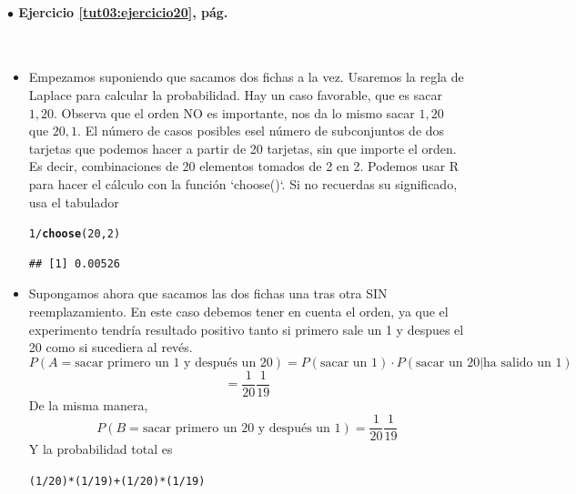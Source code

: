 \documentclass[10pt,a4paper]{article}\usepackage[]{graphicx}\usepackage[]{color}
\makeatletter
\newcommand{\hlnum}[1]{\textcolor[rgb]{0.686,0.059,0.569}{#1}}%
\newcommand{\hlopt}[1]{\textcolor[rgb]{0,0,0}{#1}}%
\newcommand{\hlstd}[1]{\textcolor[rgb]{0.345,0.345,0.345}{#1}}%
\newcommand{\hlkwd}[1]{\textcolor[rgb]{0.737,0.353,0.396}{\textbf{#1}}}%
\newenvironment{kframe}{%
 \def\at@end@of@kframe{}%
 \ifinner\ifhmode%
  \def\at@end@of@kframe{\end{minipage}}%
  \begin{minipage}{\columnwidth}%
 \fi\fi%
 \def\FrameCommand##1{\hskip\@totalleftmargin \hskip-\fboxsep
 \colorbox{shadecolor}{##1}\hskip-\fboxsep
     \hskip-\linewidth \hskip-\@totalleftmargin \hskip\columnwidth}%
 \MakeFramed {\advance\hsize-\width
   \@totalleftmargin\z@ \linewidth\hsize
   \@setminipage}}%
 {\par\unskip\endMakeFramed%
 \at@end@of@kframe}
\newenvironment{knitrout}{}{} %
\makeatother
\begin{document}
\paragraph{\bf $\bullet$ Ejercicio \ref{tut03:ejercicio20}, pág. \pageref{tut03:ejercicio20}}
\label{tut03:ejercicio20:sol}\quad\\ 
\begin{itemize}
\item Empezamos suponiendo que sacamos dos fichas a la vez. Usaremos la regla de Laplace para calcular la probabilidad. Hay un caso favorable, que es sacar ${1,20}$. Observa que el orden NO es importante, nos da lo mismo sacar ${1,20}$ que ${20, 1}$. El n\'umero de casos posibles esel n\'umero de subconjuntos de dos tarjetas que podemos hacer a partir de 20 tarjetas, sin que importe el orden. Es decir, combinaciones de 20 elementos tomados de 2 en 2. Podemos usar R para hacer el cálculo con la función `choose()`. Si no recuerdas su significado, usa el tabulador
\begin{knitrout}
\color{fgcolor}\begin{kframe}
\begin{alltt}
\hlnum{1}\hlopt{/}\hlkwd{choose}\hlstd{(}\hlnum{20}\hlstd{,}\hlnum{2}\hlstd{)}
\end{alltt}
\begin{verbatim}
## [1] 0.00526
\end{verbatim}
\end{kframe}
\end{knitrout}
\item Supongamos ahora que sacamos las dos fichas una tras otra SIN reemplazamiento. En este caso debemos tener en cuenta el orden, ya que el experimento tendría resultado positivo tanto si primero sale un 1 y despues el 20 como si sucediera al revés.  
$$P(A=\text{sacar primero un 1 y después un 20}) = P(\text{sacar un 1})· 
P(\text{sacar un 20}|\text{ha salido un 1})$$
$$=\frac{1}{20}\frac{1}{19} $$
De la misma manera, 
$$P(B=\text{sacar primero un 20 y después un 1}) =\frac{1}{20}\frac{1}{19} $$
Y la probabilidad total es 
\begin{knitrout}
\color{fgcolor}\begin{kframe}
\begin{alltt}
\hlstd{(}\hlnum{1}\hlopt{/}\hlnum{20}\hlstd{)}\hlopt{*}\hlstd{(}\hlnum{1}\hlopt{/}\hlnum{19}\hlstd{)}\hlopt{+}\hlstd{(}\hlnum{1}\hlopt{/}\hlnum{20}\hlstd{)}\hlopt{*}\hlstd{(}\hlnum{1}\hlopt{/}\hlnum{19}\hlstd{)}

\end{alltt}
\end{kframe}
\end{knitrout}
\end{itemize}
\end{document}
